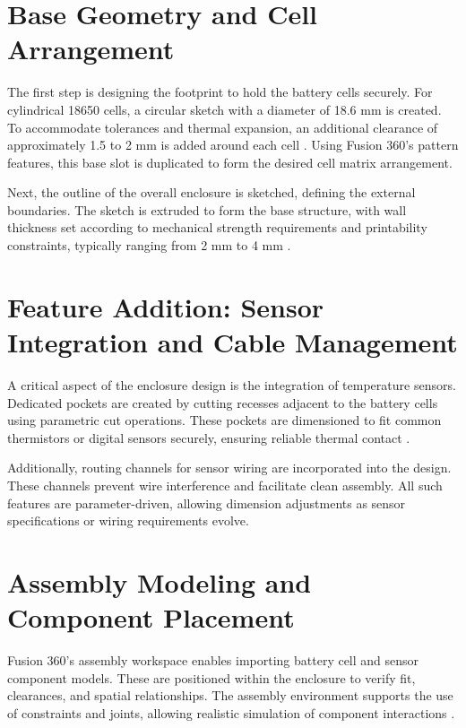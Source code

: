 \section{Base Geometry and Cell Arrangement}

The first step is designing the footprint to hold the battery cells securely. For cylindrical 18650 cells, a circular sketch with a diameter of 18.6 mm is created. To accommodate tolerances and thermal expansion, an additional clearance of approximately 1.5 to 2 mm is added around each cell \cite{pistoia2018}. Using Fusion 360’s pattern features, this base slot is duplicated to form the desired cell matrix arrangement.

Next, the outline of the overall enclosure is sketched, defining the external boundaries. The sketch is extruded to form the base structure, with wall thickness set according to mechanical strength requirements and printability constraints, typically ranging from 2 mm to 4 mm \cite{gebhardt2016}.

\section{Feature Addition: Sensor Integration and Cable Management}

A critical aspect of the enclosure design is the integration of temperature sensors. Dedicated pockets are created by cutting recesses adjacent to the battery cells using parametric cut operations. These pockets are dimensioned to fit common thermistors or digital sensors securely, ensuring reliable thermal contact \cite{anderson2020}.

Additionally, routing channels for sensor wiring are incorporated into the design. These channels prevent wire interference and facilitate clean assembly. All such features are parameter-driven, allowing dimension adjustments as sensor specifications or wiring requirements evolve.

\section{Assembly Modeling and Component Placement}

Fusion 360’s assembly workspace enables importing battery cell and sensor component models. These are positioned within the enclosure to verify fit, clearances, and spatial relationships. The assembly environment supports the use of constraints and joints, allowing realistic simulation of component interactions \cite{hogan2025}.

